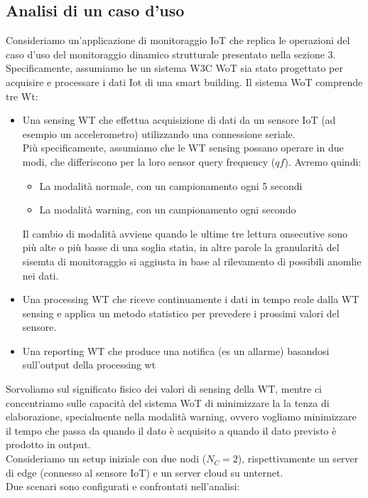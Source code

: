 \documentclass[11pt]{article}
\begin{document}
	\subsection{Analisi di un caso d'uso}
	Consideriamo un'applicazione di monitoraggio IoT che replica le operazioni del caso d'uso del monitoraggio dinamico strutturale presentato nella sezione 3. \\
	Specificamente, assumiamo he un sistema W3C WoT sia stato progettato per acquisire e processare i dati Iot di una smart building.
	Il sistema WoT comprende tre Wt:
	\begin{itemize}
		\item Una sensing WT che effettua acquisizione di dati da un sensore IoT (ad esempio un accelerometro) utilizzando una connessione seriale. \\
		Più specificamente, assumiamo che le WT sensing possano operare in due modi, che differiscono per la loro sensor query frequency ($qf$).
		Avremo quindi:
		\begin{itemize}
			\item La modalità normale, con un campionamento ogni 5 secondi
			\item La modalità warning, con un campionamento ogni secondo
		\end{itemize}
		Il cambio di modalità avviene quando le ultime tre lettura onsecutive sono più alte o più basse di una soglia statia, in altre parole la granularità del sisemta di monitoraggio si aggiusta in base al rilevamento di possibili anomlie nei dati.
	\item Una processing WT che riceve continuamente i dati in tempo reale dalla WT sensing e applica un metodo statistico per prevedere i prossimi valori del sensore.
	\item Una reporting WT che produce una notifica (es un allarme) basandosi sull'output della processing wt
	\end{itemize}

	Sorvoliamo sul significato fisico dei valori di sensing della WT, mentre ci concentriamo sulle capacità del sistema WoT di minimizzare la la tenza di elaborazione, specialmente nella modalità warning, ovvero vogliamo minimizzare il tempo che passa da quando il dato è acquisito a quando il dato previsto è prodotto in output. \\
	Consideriamo un setup iniziale con due nodi ($N_C = 2$), rispettivamente un server di edge (connesso al sensore IoT) e un server cloud su unternet. \\
	Due scenari sono configurati e confrontati nell'analisi:
	
\end{document}
